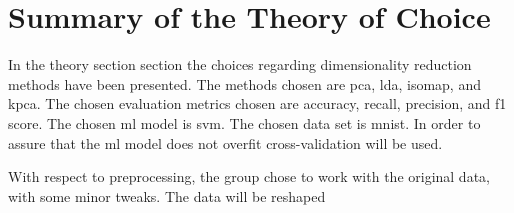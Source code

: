 \section{Summary of the Theory of Choice}\label{sec:theory-choice-summary}

In the theory section section the choices regarding dimensionality reduction methods have been presented. The methods chosen are \gls{pca}, \gls{lda}, \gls{isomap}, and \gls{kpca}. The chosen evaluation metrics chosen are accuracy, recall, precision, and f1 score. The chosen \gls{ml} model is \gls{svm}. The chosen data set is \gls{mnist}. In order to assure that the \gls{ml} model does not overfit cross-validation will be used.



With respect to preprocessing, the group chose to work with the original data, with some minor tweaks. The data will be reshaped